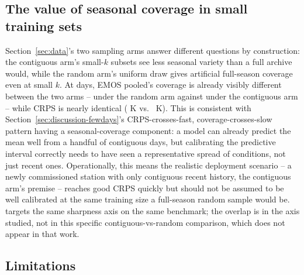 \subsection{The value of seasonal coverage in small training sets}
\label{sec:discussion-seasonal}

Section~\ref{sec:data}'s two sampling arms answer different questions by
construction: the contiguous arm's small-\(k\) subsets see less seasonal
variety than a full archive would, while the random arm's uniform draw
gives artificial full-season coverage even at small \(k\). At
\SeasonalCompareNDays{} days, EMOS pooled's coverage is already visibly
different between the two arms -- \CoverageRandomSeasonalN{} under the
random arm against \CoverageContigSeasonalN{} under the contiguous arm --
while CRPS is nearly identical (\CrpsRandomSeasonalN{} K vs.\
\CrpsContigSeasonalN{} K). This is consistent with
Section~\ref{sec:discussion-fewdays}'s CRPS-crosses-fast,
coverage-crosses-slow pattern having a seasonal-coverage component: a
model can already predict the mean well from a handful of contiguous days,
but calibrating the predictive interval correctly needs to have seen a
representative spread of conditions, not just recent ones. Operationally,
this means the realistic deployment scenario -- a newly commissioned
station with only contiguous recent history, the contiguous arm's premise
-- reaches good CRPS quickly but should not be assumed to be well
calibrated at the same training size a full-season random sample would be.
\citet{baran_2026_sharpness_penalty} targets the same sharpness axis on
the same benchmark; the overlap is in the axis studied, not in this
specific contiguous-vs-random comparison, which does not appear in that
work.

\subsection{Limitations}
\label{sec:limitations}

